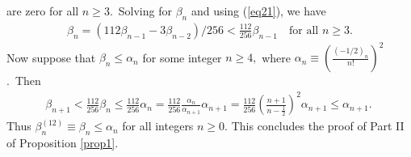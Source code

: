 \documentclass[final,oneeqnum]{siamltex}
\begin{document}
are  zero for all $n\geq 3$.\ Solving for
$\beta_{n}$ and using (\ref{eq21}), we have
\begin{eqnarray}
\beta_{n} = (112\beta_{n-1} - 3\beta_{n-2})/256 < \frac{112}{256}\beta_{n-1}
\quad \mbox{for all  $n\geq 3$.}  \nonumber
\end{eqnarray}
Now suppose that $\beta_{n} \leq \alpha_{n}$ for some integer $n\geq4,$  where
${\textstyle \alpha_{n} \equiv (\frac{(-1/2)_{n}}{n!})^2}$.\ Then
\begin{eqnarray}
\beta_{n+1} < \frac{112}{256}\beta_{n}\leq \frac{112}{256}\alpha_{n}=
\frac{112}{256}\frac{\alpha_{n}}{\alpha_{n+1}}\alpha_{n+1}=
\frac{112}{256}\left(\frac{n+1}{n-\frac{1}{2}}\right)^{2}\alpha_{n+1}
\leq\alpha_{n+1}.\  \nonumber
\end{eqnarray} 
Thus $\beta^{(12)}_{n}\equiv
\beta_{n}\leq \alpha_{n}$ for all integers $n\geq 0$.
This concludes the proof of Part II of Proposition \ref{prop1}.\,
\qquad\endproof%
\end{document}
